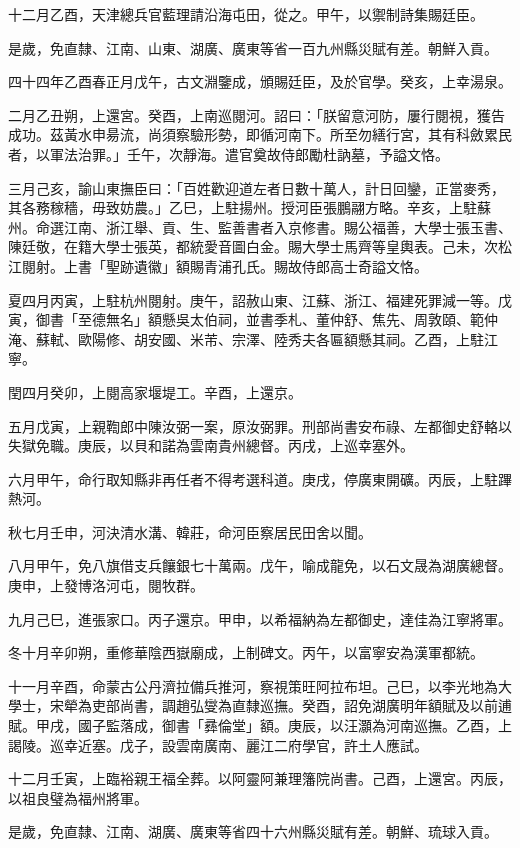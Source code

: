 \begin{pinyinscope}
十二月乙酉，天津總兵官藍理請沿海屯田，從之。甲午，以禦制詩集賜廷臣。

是歲，免直隸、江南、山東、湖廣、廣東等省一百九州縣災賦有差。朝鮮入貢。

四十四年乙酉春正月戊午，古文淵鑒成，頒賜廷臣，及於官學。癸亥，上幸湯泉。

二月乙丑朔，上還宮。癸酉，上南巡閱河。詔曰：「朕留意河防，屢行閱視，獲告成功。茲黃水申昜流，尚須察驗形勢，即循河南下。所至勿繕行宮，其有科斂累民者，以軍法治罪。」壬午，次靜海。遣官奠故侍郎勵杜訥墓，予謚文恪。

三月己亥，諭山東撫臣曰：「百姓歡迎道左者日數十萬人，計日回鑾，正當麥秀，其各務稼穡，毋致妨農。」乙巳，上駐揚州。授河臣張鵬翮方略。辛亥，上駐蘇州。命選江南、浙江舉、貢、生、監善書者入京修書。賜公福善，大學士張玉書、陳廷敬，在籍大學士張英，都統愛音圖白金。賜大學士馬齊等皇輿表。己未，次松江閱射。上書「聖跡遺徽」額賜青浦孔氏。賜故侍郎高士奇謚文恪。

夏四月丙寅，上駐杭州閱射。庚午，詔赦山東、江蘇、浙江、福建死罪減一等。戊寅，御書「至德無名」額懸吳太伯祠，並書季札、董仲舒、焦先、周敦頤、範仲淹、蘇軾、歐陽修、胡安國、米芾、宗澤、陸秀夫各匾額懸其祠。乙酉，上駐江寧。

閏四月癸卯，上閱高家堰堤工。辛酉，上還京。

五月戊寅，上親鞫郎中陳汝弼一案，原汝弼罪。刑部尚書安布祿、左都御史舒輅以失獄免職。庚辰，以貝和諾為雲南貴州總督。丙戌，上巡幸塞外。

六月甲午，命行取知縣非再任者不得考選科道。庚戌，停廣東開礦。丙辰，上駐蹕熱河。

秋七月壬申，河決清水溝、韓莊，命河臣察居民田舍以聞。

八月甲午，免八旗借支兵饟銀七十萬兩。戊午，喻成龍免，以石文晟為湖廣總督。庚申，上發博洛河屯，閱牧群。

九月己巳，進張家口。丙子還京。甲申，以希福納為左都御史，達佳為江寧將軍。

冬十月辛卯朔，重修華陰西嶽廟成，上制碑文。丙午，以富寧安為漢軍都統。

十一月辛酉，命蒙古公丹濟拉備兵推河，察視策旺阿拉布坦。己巳，以李光地為大學士，宋犖為吏部尚書，調趙弘燮為直隸巡撫。癸酉，詔免湖廣明年額賦及以前逋賦。甲戌，國子監落成，御書「彞倫堂」額。庚辰，以汪灝為河南巡撫。乙酉，上謁陵。巡幸近塞。戊子，設雲南廣南、麗江二府學官，許土人應試。

十二月壬寅，上臨裕親王福全葬。以阿靈阿兼理籓院尚書。己酉，上還宮。丙辰，以祖良璧為福州將軍。

是歲，免直隸、江南、湖廣、廣東等省四十六州縣災賦有差。朝鮮、琉球入貢。


\end{pinyinscope}
